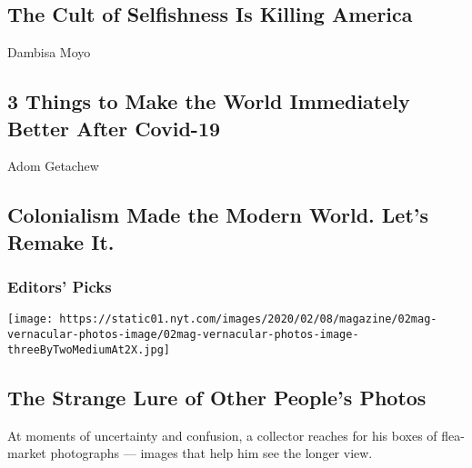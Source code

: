 \hypertarget{the-cult-of-selfishness-is-killing-america}{%
\subsection{The Cult of Selfishness Is Killing
America}\label{the-cult-of-selfishness-is-killing-america}}

\href{/2020/07/31/opinion/coronavirus-economy.html}{}

Dambisa Moyo

\hypertarget{3-things-to-make-the-world-immediately-better-after-covid-19}{%
\subsection{3 Things to Make the World Immediately Better After
Covid-19}\label{3-things-to-make-the-world-immediately-better-after-covid-19}}

\href{/2020/07/27/opinion/sunday/decolonization-statues.html}{}

Adom Getachew

\hypertarget{colonialism-made-the-modern-world-lets-remake-it}{%
\subsection{Colonialism Made the Modern World. Let's Remake
It.}\label{colonialism-made-the-modern-world-lets-remake-it}}

\hypertarget{editors-picks}{%
\subsubsection{Editors' Picks}\label{editors-picks}}

\href{/2020/07/30/magazine/the-strange-lure-of-other-peoples-photos.html}{}

\texttt{[image: https://static01.nyt.com/images/2020/02/08/magazine/02mag-vernacular-photos-image/02mag-vernacular-photos-image-threeByTwoMediumAt2X.jpg]}

\href{/2020/07/30/magazine/the-strange-lure-of-other-peoples-photos.html}{}

\hypertarget{the-strange-lure-of-other-peoples-photos}{%
\subsection{The Strange Lure of Other People's
Photos}\label{the-strange-lure-of-other-peoples-photos}}

At moments of uncertainty and confusion, a collector reaches for his
boxes of flea-market photographs --- images that help him see the longer
view.


